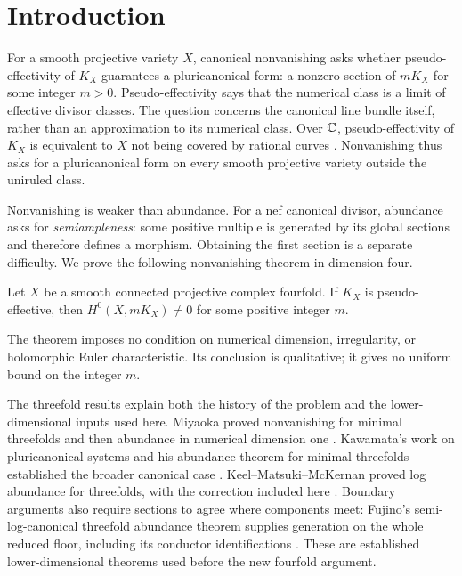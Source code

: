 \section{Introduction}
\label{sec:introduction}

For a smooth projective variety $X$, canonical nonvanishing asks whether
pseudo-effectivity of $K_X$ guarantees a pluricanonical form: a nonzero
section of $mK_X$ for some integer $m>0$. Pseudo-effectivity says that the
numerical class is a limit of effective divisor classes. The question
concerns the canonical line bundle itself, rather than an approximation
to its numerical class. Over $\mathbb C$, pseudo-effectivity of $K_X$ is
equivalent to $X$ not being covered by rational curves
\cite[Corollary~0.3]{BDPP2013}. Nonvanishing thus asks for a
pluricanonical form on every smooth projective variety outside the
uniruled class.

Nonvanishing is weaker than abundance. For a nef canonical divisor,
abundance asks for \emph{semiampleness}: some positive multiple is
generated by its global sections and therefore defines a morphism.
Obtaining the first section is a separate difficulty. We prove the
following nonvanishing theorem in dimension four.

\begin{theorem}\label{thm:nonvanishing}
Let $X$ be a smooth connected projective complex fourfold. If $K_X$ is
pseudo-effective, then $H^0(X,mK_X)\ne0$ for some positive integer $m$.
\end{theorem}

The theorem imposes no condition on numerical dimension, irregularity,
or holomorphic Euler characteristic. Its conclusion is qualitative;
it gives no uniform bound on the integer $m$.

The threefold results explain both the history of the problem and the
lower-dimensional inputs used here. Miyaoka proved nonvanishing for
minimal threefolds \cite{Miyaoka1988Nonvanishing} and then abundance
in numerical dimension one \cite[pp.~203--204]{Miyaoka1988NuOne}.
Kawamata's work on pluricanonical systems and his abundance theorem for
minimal threefolds established the broader canonical case
\cite{Kawamata1985,Kawamata1992}. Keel--Matsuki--McKernan proved log
abundance for threefolds, with the correction included here
\cite{KMM1994,KMM2004}. Boundary arguments also require sections to
agree where components meet: Fujino's semi-log-canonical threefold
abundance theorem supplies generation on the whole reduced floor,
including its conductor identifications
\cite[Corollary~4.10]{Fujino2000}. These are established
lower-dimensional theorems used before the new fourfold argument.

